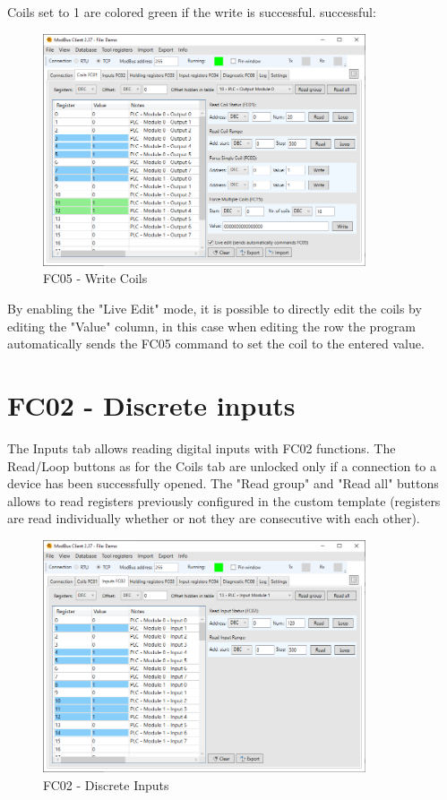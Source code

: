 Coils set to 1 are colored green if the write is successful.
successful:

\begin{figure}[H]
\centering
\includegraphics[width=0.85\textwidth]{../Img/Modbus_Client_Coils_Write_00.PNG}
\caption{FC05 - Write Coils}
\end{figure}

By enabling the "Live Edit" mode, it is possible to directly edit 
the coils by editing the "Value" column, in this case when editing the row the 
program automatically sends the FC05 command to set the coil to the entered value.

\newpage
\section{FC02 - Discrete inputs}

The Inputs tab allows reading digital inputs with FC02 functions. The Read/Loop buttons
as for the Coils tab are unlocked only if a connection to a device has been successfully
opened. The "Read group" and "Read all" buttons allows to read registers previously configured 
in the custom template (registers are read individually whether or not they are consecutive
with each other).

\begin{figure}[H]
\centering
\includegraphics[width=0.85\textwidth]{../Img/Modbus_Client_Inputs_00.PNG}
\caption{FC02 - Discrete Inputs}
\end{figure}

